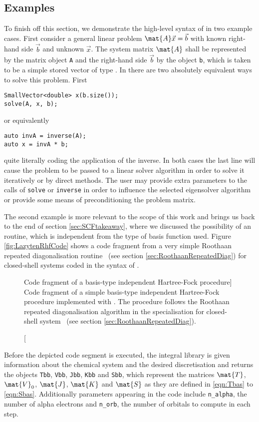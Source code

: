 \subsection{Examples}
\label{sec:LazytenExamples}
To finish off this section,
we demonstrate the high-level syntax of \lazyten
in two example cases.
First consider a general linear problem $\mat{A} \vec{x} = \vec{b}$
with known right-hand side $\vec{b}$ and unknown $\vec{x}$.
The system matrix $\mat{A}$ shall
be represented by the \lazyten matrix object \texttt{A}
and the right-hand side $\vec{b}$ by the object \texttt{b},
which is taken to be a simple stored vector of type .
In \lazyten there are two absolutely equivalent ways to solve this problem.
First
\begin{lstlisting}[style=c++]
SmallVector<double> x(b.size());
solve(A, x, b);
\end{lstlisting}
or equivalently
\begin{lstlisting}[style=c++]
auto invA = inverse(A);
auto x = invA * b;
\end{lstlisting}
\ie quite literally coding the application of the inverse.
In both cases the last line will cause the problem to be passed
to a linear solver algorithm in order to solve it iteratively
or by direct methods.
The user may provide extra parameters to the calls of \texttt{solve}
or \texttt{inverse} in order to influence
the selected eigensolver algorithm
or provide some means of preconditioning the problem matrix.

The second example is more relevant to the scope of this
work and brings us back to the end of section \vref{sec:SCFtakeaway},
where we discussed the possibility of
an \SCF routine,
which is independent from the type of basis function used.
Figure \vref{fig:LazytenRhfCode} shows a code fragment
from a very simple Roothaan repeated diagonalisation \SCF routine%
~(see section \vref{sec:RoothaanRepeatedDiag})
for closed-shell systems coded in the syntax of \lazyten.

\begin{figure}
	\centering
	\caption
	[Code fragment of a basis-type independent
		Hartree-Fock procedure]
	{Code fragment of a simple basis-type independent
		Hartree-Fock procedure implemented with \lazyten.
		The procedure follows the Roothaan repeated diagonalisation
		algorithm in the specialisation for closed-shell system%
		~(see section \ref{sec:RoothaanRepeatedDiag}).
	}
	\label{fig:LazytenRhfCode}
\end{figure}
Before the depicted code segment is executed,
the integral library is given information about the chemical system
and the desired discretisation and returns
the objects \texttt{Tbb}, \texttt{Vbb}, \texttt{Jbb}, \texttt{Kbb}
and \texttt{Sbb},
which represent the matrices
$\mat{T}$, $\mat{V}_0$, $\mat{J}$, $\mat{K}$ and $\mat{S}$
as they are defined in \eqref{eqn:Tbas} to \eqref{eqn:Sbas}.
Additionally parameters appearing in the code
include \texttt{n\_alpha}, the number of alpha electrons
and \texttt{n\_orb}, the number of \SCF orbitals to compute in each step.

